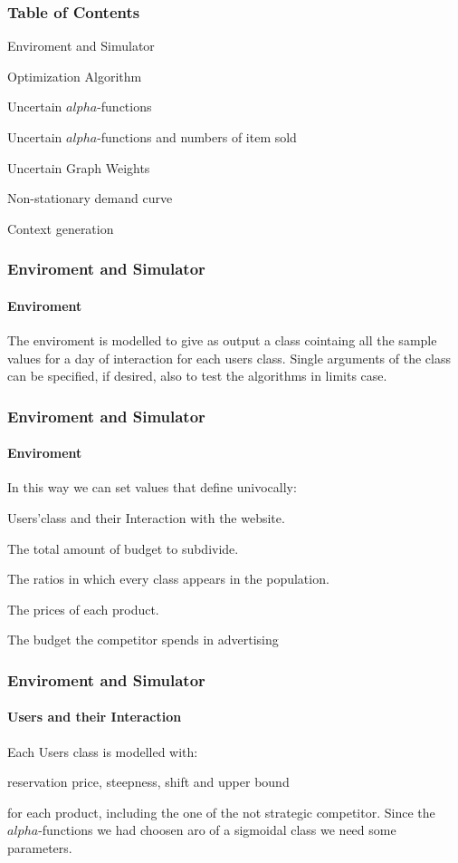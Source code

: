 \documentclass{beamer}
\begin{document}
\frame{\titlepage}






\begin{frame}
    \frametitle{Table of Contents}
    \begin{list}{*}{\setlength{\itemsep}{0.5cm}}
        \item<1-> Enviroment and Simulator
        \item<2-> Optimization Algorithm
        \item<3-> Uncertain $alpha$-functions
        \item<4-> Uncertain $alpha$-functions and numbers of item sold
        \item<5-> Uncertain Graph Weights
        \item<6-> Non-stationary demand curve
        \item<7-> Context generation
    \end{list}
    
\end{frame}


\begin {frame}
\frametitle{Enviroment and Simulator}
\framesubtitle{Enviroment}
The enviroment is modelled to give as output a class cointaing all the sample values for a day of interaction for each users class.
Single arguments of the class can be specified, if desired, also to test the algorithms in limits case.
\end {frame}

\begin {frame}
\frametitle{Enviroment and Simulator}
\framesubtitle{Enviroment}
In this way we can set values that define univocally:
\begin{list}{-}{\setlength{\itemsep}{0.5cm}}
    \item Users'class and their Interaction with the website.
    \item The total amount of budget to subdivide.
    \item The ratios in which every class appears in the population.
    \item The prices of each product.
    \item The budget the competitor spends in advertising
\end{list}
\end {frame}

\begin {frame}
\frametitle{Enviroment and Simulator}
\framesubtitle{Users and their Interaction}
Each Users class is modelled with:
\begin{block}{ reservation price, steepness, shift and upper bound} \end{block}
for each product, including the one of the not strategic competitor.
Since the $alpha$-functions we had choosen aro of a sigmoidal class we need some parameters.
\end {frame}
\end{document}
